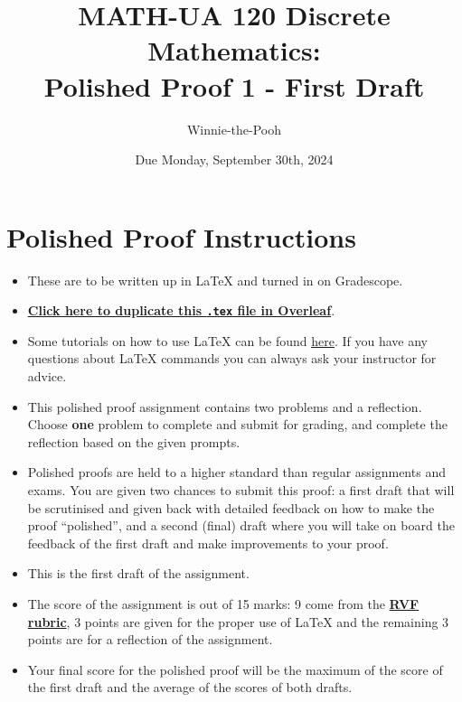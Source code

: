 \documentclass{article}
\title{\textbf{MATH-UA 120 Discrete Mathematics: \\ Polished Proof 1 - First Draft}}
\author{%
    Winnie-the-Pooh %
}
\date{Due Monday, September 30th, 2024} %
\theoremstyle{definition}
\begin{document}
\maketitle %

\vfill


\section*{Polished Proof Instructions}

\begin{itemize}
    \item These are to be written up in \LaTeX{} and turned in on Gradescope.
    \item \href{https://bit.ly/4gxMEGA}{\textbf{Click here to duplicate this \texttt{.tex} file in Overleaf}}.
    \item Some tutorials on how to use \LaTeX{} can be found \href{https://www.overleaf.com/learn/latex/Tutorials}{\underline{here}}. If you have any questions about \LaTeX{} commands you can always ask your instructor for advice.
    \item This polished proof assignment contains two problems and a reflection. Choose \textbf{one} problem to complete and submit for grading, and complete the reflection based on the given prompts.
    \item Polished proofs are held to a higher standard than regular assignments and exams. You are given two chances to submit this proof: a first draft that will be scrutinised and given back with detailed feedback on how to make the proof ``polished'', and a second (final) draft where you will take on board the feedback of the first draft and make improvements to your proof.
    \item This is the first draft of the assignment.
    \item The score of the assignment is out of 15 marks: 9 come from the \href{https://drive.google.com/file/d/1YZhhGv5OyPdx0-VDa6i6cftkzPromMRY/view?usp=drive_link}{\textbf{RVF rubric}}, 3 points are given for the proper use of \LaTeX{} and the remaining 3 points are for a reflection of the assignment.
    \item Your final score for the polished proof will be the maximum of the score of the first draft and the average of the scores of both drafts.
\end{itemize}
\end{document}
